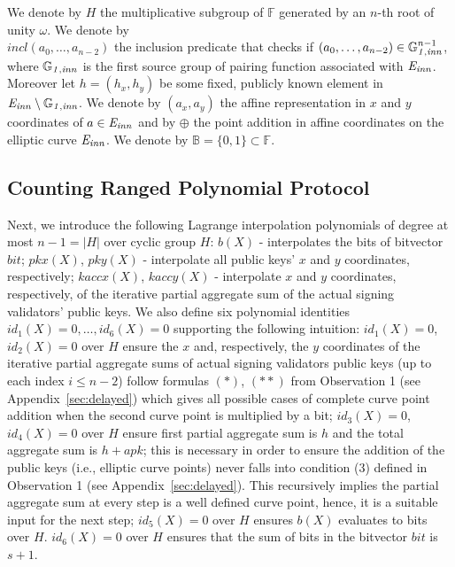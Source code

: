 \vspace{-0.009in}
\noindent We denote by $H$ the multiplicative subgroup of $\mathbb{F}$ generated 
by an $n$-th root of unity $\omega$. We denote by \\ $\mathit{incl}(a_0, \ldots, a_{n-2})$ the inclusion 
predicate that checks if $(a_0, \ldots, a_{n-2}) \in \mathbb{G}_{\mathit{1,inn}}^{n-1}$, where $\mathbb{G}_{\mathit{1,inn}}$ is the first source group 
of pairing function associated with $\mathit{E}_{\mathit{inn}}$. Moreover let $h = (\mathit{h_x}, \mathit{h_y})$ be some fixed, 
publicly known element in $\mathit{E}_{\mathit{inn}} \setminus \mathbb{G}_{\mathit{1,inn}}$. We denote by $(a_x, a_y)$ the affine representation in 
$x$ and $y$ coordinates of $a \in \mathit{E}_{\mathit{inn}}$ and by $\oplus$ the point addition in affine coordinates on the 
elliptic curve $\mathit{E}_{\mathit{inn}}$. We denote by $\mathbb{B} = \{0,1\} \subset \mathbb{F}$. \\
\vspace{-0.15in}

\subsection{Counting Ranged Polynomial Protocol}
\label{sec_vt}

\noindent Next, we introduce the following Lagrange interpolation polynomials of degree at most $n-1 = |H|$ over cyclic group $H$: 
$b(X)$ - interpolates the bits of bitvector $\mathit{bit}$; $pkx(X)$, $pky(X)$ - interpolate all public keys' 
$x$ and $y$ coordinates, respectively; $kaccx(X)$, $kaccy(X)$ - interpolate $x$ and $y$ coordinates, respectively, 
of the iterative partial aggregate sum of the actual signing validators' public keys. We also define six polynomial identities 
$id_1(X)=0, \ldots, id_6(X)=0$ supporting the following intuition: $id_1(X)=0$, $id_2(X)=0$ over $H$ 
ensure the $x$ and, respectively, the $y$ coordinates of the iterative partial aggregate sums of actual signing validators public keys 
(up to each index $i \leq n-2$) follow formulas $(\ast)$, $(\ast\ast)$ from Observation 1 (see Appendix~\ref{sec:delayed}) which gives all possible cases of 
complete curve point addition when the second curve point is multiplied by a bit; $id_3(X)=0$, $id_4(X)=0$ over $H$ 
ensure first partial aggregate sum is $h$ and the total aggregate sum is $h + \mathit{apk}$; this is necessary in order to ensure the 
addition of the public keys (i.e., elliptic curve points) never falls into condition (3) defined in Observation 1 (see Appendix~\ref{sec:delayed}). 
This recursively implies the partial aggregate sum at every step is a well defined curve point, hence, it is a suitable input for the next step; 
$id_5(X)=0$ over $H$ ensures $b(X)$ evaluates to bits over $H$. $id_6(X)= 0$ over $H$ ensures that the sum of bits in the 
bitvector $\mathit{bit}$ is $s+1$. \\


